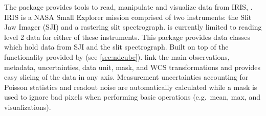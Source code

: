 The  package provides tools to read, manipulate and visualize data from IRIS, \citep{DePontieu2014}.
IRIS is a NASA Small Explorer mission comprised of two instruments: the Slit Jaw Imager (SJI) and a rastering slit spectrograph.
 is currently limited to reading level 2 data for either of these instruments.
This package provides data classes which hold data from SJI and the slit spectrograph.
Built on top of the functionality provided by  (see \autoref{sec:ndcube}).  link the main observations, metadata, uncertainties, data unit, mask, and WCS transformations and provides easy slicing of the data in any axis.
Measurement uncertainties accounting for Poisson statistics and readout noise are automatically calculated while a mask is used to ignore bad pixels when performing basic operations (e.g.\ mean, max, and visualizations).
